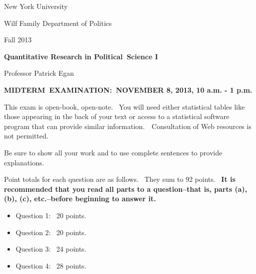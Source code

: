 \documentclass[11pt]{article}
\begin{document}
New York University

Wilf Family Department of Politics

Fall 2013

\begin{center}
{\large \textbf{Quantitative Research in Political\ Science I}}

Professor Patrick Egan

\bigskip
\end{center}

\bigskip

\begin{center}
\textbf{MIDTERM\ EXAMINATION:\ NOVEMBER 8, 2013, 10 a.m. - 1 p.m.}
\end{center}

This exam is open-book, open-note. \ You will need either statistical tables
like those appearing in the back of your text or access to a statistical
software program that can provide similar information.\ \ Consultation of
Web resources is not permitted.\bigskip

Be sure to show all your work and to use complete sentences to provide
explanations.\bigskip

Point totals for each question are as follows. \ They sum to 92 points. \ 
\textbf{It is recommended that you read all parts to a question--that is,
parts (a), (b), (c), etc.--before beginning to answer it.}

\begin{itemize}
\item Question 1: \ 20 points.

\item Question 2: \ 20 points.

\item Question 3: \ 24 points.

\item Question 4: \ 28 points.
\end{itemize}

\begin{center}
\newpage
\end{center}
\end{document}
